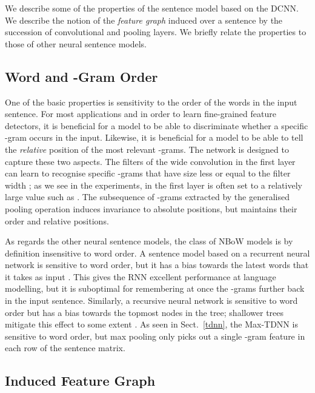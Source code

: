 \documentclass[11pt]{article}
\begin{document}
We describe some of the properties of the sentence model based on the DCNN. We describe the  notion of the \emph{feature graph} induced over a sentence by the succession of convolutional and pooling layers. We briefly relate the properties to those of other neural sentence models.

\subsection{Word and -Gram Order}
One of the basic properties is sensitivity to the order of the words in the input sentence. For most applications and in order to learn fine-grained feature detectors, it is beneficial for a model to be able to discriminate whether a specific -gram occurs in the input. Likewise, it is beneficial for a model to be able to tell the \emph{relative} position of the most relevant -grams. The network is designed to capture these two aspects. The filters  of the wide convolution in the first layer can learn to recognise specific -grams that have size less or equal to the filter width ; as we see in the experiments,  in the first layer is often set to a relatively large value such as . The subsequence of -grams extracted by the generalised pooling operation induces invariance to absolute positions, but maintains their order and relative positions.

As regards the other neural sentence models, the class of NBoW models is by definition insensitive to word order. A sentence model based on a recurrent neural network is sensitive to word order, but it has a bias towards the latest words that it takes as input \cite{DBLP:conf/icassp/MikolovKBCK11}. This gives  the RNN excellent performance at language modelling, but it is suboptimal for remembering at once the -grams further back in the input sentence. Similarly, a recursive neural network is sensitive to word order but has a  bias towards the topmost nodes in the tree; shallower trees mitigate this effect to some extent \cite{SocherEtAl2013:DTRNN}. As seen in Sect.~\ref{tdnn}, the Max-TDNN is sensitive to word order, but max pooling only picks out a single -gram feature in each row of the sentence matrix. 

\subsection{Induced Feature Graph}
\end{document}
